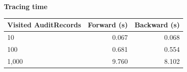 \par\medskip\noindent
\begin{center}
{\small\setlength{\tabcolsep}{7pt}\renewcommand{\arraystretch}{1.12}
\textbf{Tracing time}\par\smallskip
\begin{tabular}{@{}lrr@{}}\toprule
\textbf{Visited AuditRecords} & \textbf{Forward (s)} & \textbf{Backward (s)} \\
\midrule
10 & 0.067 & 0.068 \\
100 & 0.681 & 0.554 \\
1,000 & 9.760 & 8.102 \\
\bottomrule\end{tabular}}
\end{center}
\par\medskip
